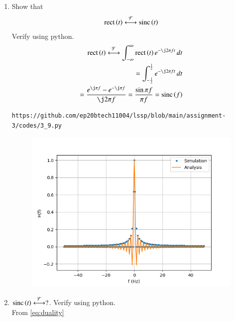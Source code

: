 \documentclass[journal,12pt,twocolumn]{IEEEtran}
\renewcommand\thesection{\arabic{section}}
\begin{document}
\begin{enumerate}[label=\thesection.\arabic*
		,ref=\thesection.\theenumi]
\begin{figure}[!ht]
\begin{center}
			\end{center}
			\label{fig:}	
		\end{figure}
		\vspace{4cm}
		\item Show that 
		\begin{align}
			\text{rect}\left(t\right) \overset{\mathcal{F}}{ \longleftrightarrow} \text{sinc}\left(t\right)
		\end{align}
		Verify using python.\\
		\solution 
		\begin{align}
			\rect{t}\system{F}\int_{-\infty}^{\infty}\rect{t}e^{-\j2\pi ft}\, dt \\
			=\int_{-\frac{1}{2}}^{\frac{1}{2}}e^{-\j2\pi ft}\, dt \\
			=\frac{e^{\j\pi f} - e^{-\j\pi f}}{\j2\pi f} = \frac{\sin{\pi f}}{\pi f} = \sinc{f}
			\label{eq:fourier-rect}
		\end{align}		
		\begin{lstlisting}
https://github.com/ep20btech11004/lssp/blob/main/assignment-3/codes/3_9.py
		\end{lstlisting}
		\begin{figure}[!ht]
			\begin{center}
				\includegraphics[width=\columnwidth]{./figs/3_9.png}
			\end{center}
			\label{fig:}	
		\end{figure}
		\item 
		$	 \text{sinc}\left(t\right)\overset{\mathcal{F}}{ \longleftrightarrow} ?$.  Verify using python.\\
		\solution From \eqref{eq:duality}
		\begin{align}

\end{align}
\end{enumerate}
\end{document}
